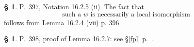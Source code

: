 \documentclass[12pt]{article}%
\theoremstyle{remark}
\theoremstyle{definition}
\newtheorem{s}[thm]{\S}%
\begin{document}

\begin{s} 
P.~397, Notation 16.2.5 (ii). The fact that 
\begin{equation}\label{1625}
\text{such a $w$ is necessarily a local isomorphism}
\end{equation}
follows from Lemma 16.2.4 (vii) p. 396.
\end{s}

%

\begin{s} 
P.~398, proof of Lemma 16.2.7: see \S\ref{fpl} p.~\pageref{fpl}.
\end{s}

%
\end{document}
